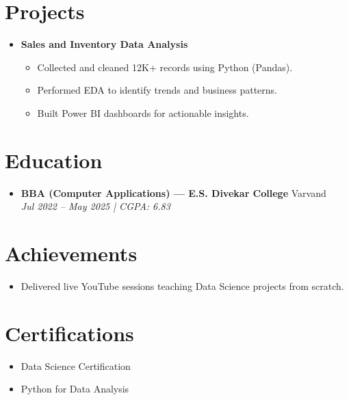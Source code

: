 \documentclass[letterpaper,10.8pt]{article}
\begin{document}
\section{Projects}
\begin{itemize}[leftmargin=0.15in]

    \item
    \textbf{Sales and Inventory Data Analysis}
    \begin{itemize}
        \item Collected and cleaned 12K+ records using Python (Pandas).
        \item Performed EDA to identify trends and business patterns.
        \item Built Power BI dashboards for actionable insights.
    \end{itemize}

\end{itemize}

\section{Education}
\begin{itemize}[leftmargin=0.15in, label={}]

    \item
    \textbf{BBA (Computer Applications) --- E.S. Divekar College} \hfill Varvand \\
    \textit{Jul 2022 -- May 2025 | CGPA: 6.83}

\end{itemize}


\section{Achievements}
\begin{itemize}[leftmargin=0.15in]
    \item Delivered live YouTube sessions teaching Data Science projects from scratch.
\end{itemize}



\section{Certifications}
\begin{itemize}[leftmargin=0.15in]
    \item Data Science Certification
    \item Python for Data Analysis
\end{itemize}
\end{document}
